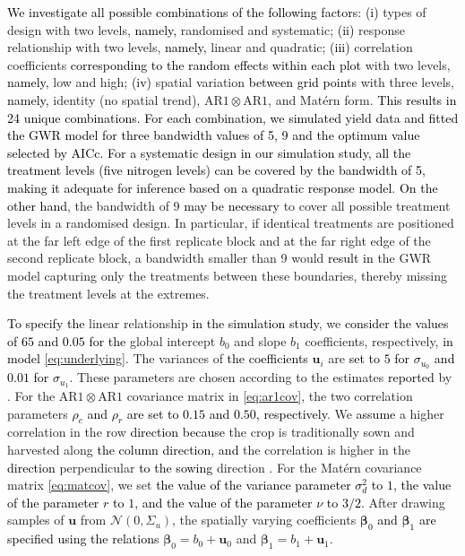 \documentclass[a4paper]{article} 	%
\newcommand{\Matern}{Mat\'ern }
\newcommand{\N}{\mathcal{N}}
\newcommand{\AR}{\mathrm{AR1}}
\newcommand{\revision}[1]{\textcolor{black}{#1}}
\newcommand{\zc}[1]{\textcolor{black}{#1}}
\begin{document}
\zc{We investigate \revision{all possible} combination\revision{s} of the following factors}: \revision{(i)} types of design with two levels, \revision{namely,} randomised and systematic; \revision{(ii)} response relationship with two levels, \revision{namely,} linear and quadratic; \revision{(iii)} correlation coefficients \revision{corresponding to the random effects within each plot} with two levels, \revision{namely,} low and high; \revision{(iv)} spatial variation \revision{between grid points} with three levels, \revision{namely,} identity (no spatial trend), $\AR\otimes\AR$, and \Matern form. \zc{This results in \revision{24} unique combinations. For each combination, we simulated yield data and fitted the GWR model for three bandwidth values of 5, 9 and the optimum \revision{value selected} by AICc.} \revision{For a systematic design in our simulation study, all the treatment levels (five nitrogen levels) can be covered by the bandwidth of 5, making it adequate for inference based on a quadratic response model}. \revision{On the other hand}, the bandwidth of 9 \revision{may be necessary} to cover all possible treatment levels in a randomised design. In particular, if identical treatments are positioned at the far left edge of the first replicate block and \revision{at} the far right edge of the second replicate block, a bandwidth smaller than 9 would  \revision{result in} the GWR model capturing only the treatments between these boundaries, thereby missing the treatment level\revision{s} at the extremes.


\revision{To specify the} linear relationship \revision{in the simulation study}, we \revision{consider the values of $65$ and $0.05$ for the} global intercept $b_0$ and slope $b_1$ coefficients, respectively, \zc{in model \eqref{eq:underlying}}. The variances of \revision{the coefficients} $\bm{u}_i$ are \revision{set to $5$ for $\sigma_{u_0}$ and $0.01$ for $\sigma_{u_1}$}. The\revision{se} parameters are chosen according to the estimates \revision{reported} by \textcite{Cao2022Bayesian}. For the $\AR\otimes\AR$ covariance matrix in \eqref{eq:ar1cov}, the two correlation parameters \revision{$\rho_c$ and $\rho_r$ are set to $0.15$ and $0.50$, respectively}. We \revision{assume} a higher correlation in the row \revision{direction because} the crop is traditionally sown and harvested along \revision{the column direction,} \revision{and} the correlation is higher in the \revision{direction} perpendicular \revision{to the sowing} direction \parencite{Marchant2019Establishinga}. For the \Matern covariance matrix \eqref{eq:matcov}, we set \revision{the value of the variance parameter $\sigma_d^2$ to $1$, the value of the parameter $r$ to $1$, and the value of the parameter $\nu$ to $3/2$}. After drawing samples of $\bm{u}$ from $\N(0,\Sigma_u)$, the spatially varying coefficients \revision{$\bm{\beta}_0$ and $\bm{\beta}_1$ are specified using the relations} $\bm{\beta}_0 = b_0 + \bm{u}_0$ and $\bm{\beta}_1 = b_1 + \bm{u}_1$. 
\end{document}
